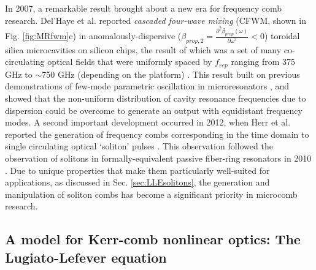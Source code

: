 
In 2007, a remarkable result brought about a new era for frequency comb research. Del'Haye et al. reported \textit{cascaded four-wave mixing} (CFWM, shown in Fig. \ref{fig:MRfwm}c) in anomalously-dispersive ($\beta_{prop,2}=\frac{\partial^2\beta_{prop}(\omega)}{\partial\omega^2}<0$) toroidal silica microcavities on silicon chips, the result of which was a set of many co-circulating optical fields that were uniformly spaced by $f_{rep}$ ranging from 375 GHz to $\sim$750 GHz (depending on the platform) \cite{DelHaye2007}. This result built on previous demonstrations of few-mode parametric oscillation in microresonators \cite{Kippenberg2004, Savchenkov2004,Agha2007}, and showed that the non-uniform distribution of cavity resonance frequencies due to dispersion could be overcome to generate an output with equidistant frequency modes. A second important development occurred in 2012, when Herr et al. reported the generation of frequency combs corresponding in the time domain to single circulating optical `soliton' pulses \cite{Herr2012a,Herr2014}. This observation followed the observation of solitons in formally-equivalent passive fiber-ring resonators in 2010 \cite{Leo2010a}. Due to unique properties that make them particularly well-suited for applications, as discussed in Sec. \ref{sec:LLEsolitons}, the generation and manipulation of soliton combs has become a significant priority in microcomb research. 

\subsection{A model for Kerr-comb nonlinear optics: The Lugiato-Lefever equation}

